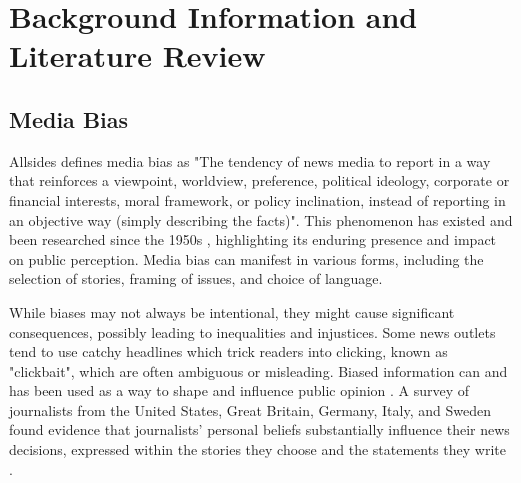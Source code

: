 \chapter{Background Information and Literature Review}
\label{cha:2}

\section{Media Bias}

Allsides \cite{allsides-2022-bias-definition} defines media bias as "The tendency of news media to report in a way that reinforces a viewpoint, worldview, preference, political ideology, corporate or financial interests, moral framework, or policy inclination, instead of reporting in an objective way (simply describing the facts)". This phenomenon has existed and been researched since the 1950s \cite{white-1950-case-study-selection-news}, highlighting its enduring presence and impact on public perception. Media bias can manifest in various forms, including the selection of stories, framing of issues, and choice of language.

While biases may not always be intentional, they might cause significant consequences, possibly leading to inequalities and injustices. Some news outlets tend to use catchy headlines which trick readers into clicking, known as "clickbait", which are often ambiguous or misleading. Biased information can and has been used as a way to shape and influence public opinion \cite{aires-2020-information}. A survey of journalists from the United States, Great Britain, Germany, Italy, and Sweden found evidence that journalists' personal beliefs substantially influence their news decisions, expressed within the stories they choose and the statements they write \cite{patterson-donsbach-1996-news-decisions}.

